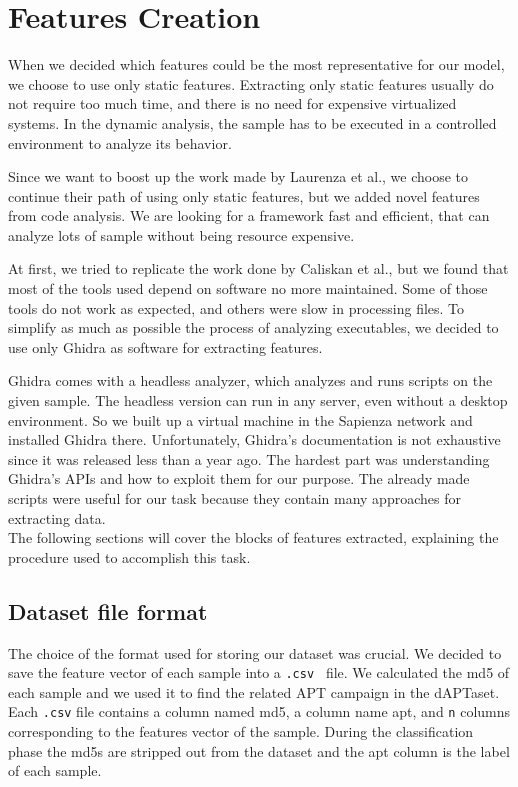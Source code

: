 \chapter{Features Creation}

When we decided which features could be the most representative for our model, we choose to use only static features. Extracting only static features usually do not require too much time, and there is no need for expensive virtualized systems. In the dynamic analysis, the sample has to be executed in a controlled environment to analyze its behavior. 

Since we want to boost up the work made by Laurenza et al., we choose to continue their path of using only static features, but we added novel features from code analysis.  We are looking for a framework fast and efficient, that can analyze lots of sample without being resource expensive.

At first, we tried to replicate the work done by Caliskan et al., but we found that most of the tools used depend on software no more maintained. Some of those tools do not work as expected, and others were slow in processing files. To simplify as much as possible the process of analyzing executables, we decided to use only Ghidra as software for extracting features.

Ghidra comes with a headless analyzer, which analyzes and runs scripts on the given sample. The headless version can run in any server, even without a desktop environment. So we built up a virtual machine in the Sapienza network and installed Ghidra there.  Unfortunately, Ghidra's documentation is not exhaustive since it was released less than a year ago. The hardest part was understanding Ghidra's APIs and how to exploit them for our purpose. The already made scripts were useful for our task because they contain many approaches for extracting data. \\



The following sections will cover the blocks of features extracted, explaining the procedure used to accomplish this task.

\section{Dataset file format}
The choice of the format used for storing our dataset was crucial.
We decided to save the feature vector of each sample into a \texttt{.csv } file. We calculated the md5 of each sample and we used it to find the related APT campaign in the dAPTaset. Each \texttt{.csv} file contains a column named md5, a column name apt, and \texttt{n} columns corresponding to the features vector of the sample. During the classification phase the md5s are stripped out from the dataset and the apt column is the label of each sample.

